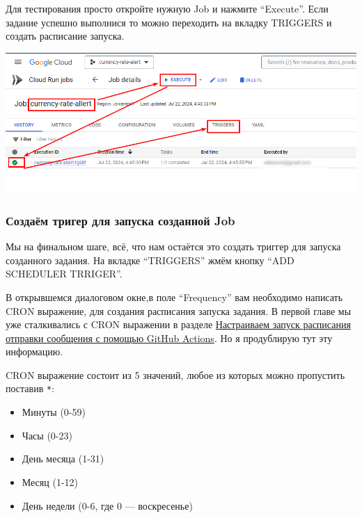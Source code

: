 \documentclass[
]{book}
\providecommand{\tightlist}{%
  \setlength{\itemsep}{0pt}\setlength{\parskip}{0pt}}
\begin{document}
Для тестирования просто откройте нужную Job и нажмите ``Execute''. Если задание успешно выполнися то можно переходить на вкладку TRIGGERS и создать расписание запуска.

\includegraphics{img/9-6.png}

\subsubsection{Создаём тригер для запуска созданной Job}\label{ux441ux43eux437ux434ux430ux451ux43c-ux442ux440ux438ux433ux435ux440-ux434ux43bux44f-ux437ux430ux43fux443ux441ux43aux430-ux441ux43eux437ux434ux430ux43dux43dux43eux439-job}

Мы на финальном шаге, всё, что нам остаётся это создать триггер для запуска созданного задания. На вкладке ``TRIGGERS'' жмём кнопку ``ADD SCHEDULER TRRIGER''.

В открывшемся диалоговом окне,в поле ``Frequency'' вам необходимо написать CRON выражение, для создания расписания запуска задания. В первой главе мы уже сталкивались с CRON выражении в разделе \hyperref[ux43dux430ux441ux442ux440ux430ux438ux432ux430ux435ux43c-ux437ux430ux43fux443ux441ux43a-ux440ux430ux441ux43fux438ux441ux430ux43dux438ux44f-ux43eux442ux43fux440ux430ux432ux43aux438-ux441ux43eux43eux431ux449ux435ux43dux438ux44f-ux441-ux43fux43eux43cux43eux449ux44cux44e-github-actions]{Настраиваем запуск расписания отправки сообщения с помощью GitHub Actions}. Но я продублирую тут эту информацию.

CRON выражение состоит из 5 значений, любое из которых можно пропустить поставив \texttt{*}:

\begin{itemize}
\tightlist
\item
  Минуты (0-59)
\item
  Часы (0-23)
\item
  День месяца (1-31)
\item
  Месяц (1-12)
\item
  День недели (0-6, где 0 --- воскресенье)
\end{itemize}
\end{document}
